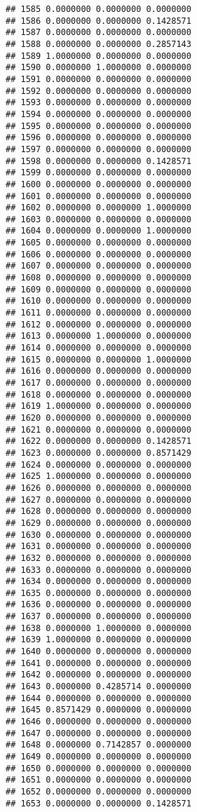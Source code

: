 \documentclass[
]{article}
\begin{document}
\begin{verbatim}
## 1585 0.0000000 0.0000000 0.0000000
## 1586 0.0000000 0.0000000 0.1428571
## 1587 0.0000000 0.0000000 0.0000000
## 1588 0.0000000 0.0000000 0.2857143
## 1589 1.0000000 0.0000000 0.0000000
## 1590 0.0000000 1.0000000 0.0000000
## 1591 0.0000000 0.0000000 0.0000000
## 1592 0.0000000 0.0000000 0.0000000
## 1593 0.0000000 0.0000000 0.0000000
## 1594 0.0000000 0.0000000 0.0000000
## 1595 0.0000000 0.0000000 0.0000000
## 1596 0.0000000 0.0000000 0.0000000
## 1597 0.0000000 0.0000000 0.0000000
## 1598 0.0000000 0.0000000 0.1428571
## 1599 0.0000000 0.0000000 0.0000000
## 1600 0.0000000 0.0000000 0.0000000
## 1601 0.0000000 0.0000000 0.0000000
## 1602 0.0000000 0.0000000 1.0000000
## 1603 0.0000000 0.0000000 0.0000000
## 1604 0.0000000 0.0000000 1.0000000
## 1605 0.0000000 0.0000000 0.0000000
## 1606 0.0000000 0.0000000 0.0000000
## 1607 0.0000000 0.0000000 0.0000000
## 1608 0.0000000 0.0000000 0.0000000
## 1609 0.0000000 0.0000000 0.0000000
## 1610 0.0000000 0.0000000 0.0000000
## 1611 0.0000000 0.0000000 0.0000000
## 1612 0.0000000 0.0000000 0.0000000
## 1613 0.0000000 1.0000000 0.0000000
## 1614 0.0000000 0.0000000 0.0000000
## 1615 0.0000000 0.0000000 1.0000000
## 1616 0.0000000 0.0000000 0.0000000
## 1617 0.0000000 0.0000000 0.0000000
## 1618 0.0000000 0.0000000 0.0000000
## 1619 1.0000000 0.0000000 0.0000000
## 1620 0.0000000 0.0000000 0.0000000
## 1621 0.0000000 0.0000000 0.0000000
## 1622 0.0000000 0.0000000 0.1428571
## 1623 0.0000000 0.0000000 0.8571429
## 1624 0.0000000 0.0000000 0.0000000
## 1625 1.0000000 0.0000000 0.0000000
## 1626 0.0000000 0.0000000 0.0000000
## 1627 0.0000000 0.0000000 0.0000000
## 1628 0.0000000 0.0000000 0.0000000
## 1629 0.0000000 0.0000000 0.0000000
## 1630 0.0000000 0.0000000 0.0000000
## 1631 0.0000000 0.0000000 0.0000000
## 1632 0.0000000 0.0000000 0.0000000
## 1633 0.0000000 0.0000000 0.0000000
## 1634 0.0000000 0.0000000 0.0000000
## 1635 0.0000000 0.0000000 0.0000000
## 1636 0.0000000 0.0000000 0.0000000
## 1637 0.0000000 0.0000000 0.0000000
## 1638 0.0000000 1.0000000 0.0000000
## 1639 1.0000000 0.0000000 0.0000000
## 1640 0.0000000 0.0000000 0.0000000
## 1641 0.0000000 0.0000000 0.0000000
## 1642 0.0000000 0.0000000 0.0000000
## 1643 0.0000000 0.4285714 0.0000000
## 1644 0.0000000 0.0000000 0.0000000
## 1645 0.8571429 0.0000000 0.0000000
## 1646 0.0000000 0.0000000 0.0000000
## 1647 0.0000000 0.0000000 0.0000000
## 1648 0.0000000 0.7142857 0.0000000
## 1649 0.0000000 0.0000000 0.0000000
## 1650 0.0000000 0.0000000 0.0000000
## 1651 0.0000000 0.0000000 0.0000000
## 1652 0.0000000 0.0000000 0.0000000
## 1653 0.0000000 0.0000000 0.1428571

\end{verbatim}
\end{document}
